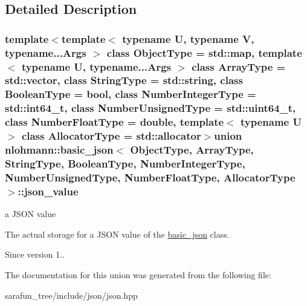 \subsection{Detailed Description}
\subsubsection*{template$<$template$<$ typename U, typename V, typename...\-Args $>$ class Object\-Type = std\-::map, template$<$ typename U, typename...\-Args $>$ class Array\-Type = std\-::vector, class String\-Type = std\-::string, class Boolean\-Type = bool, class Number\-Integer\-Type = std\-::int64\-\_\-t, class Number\-Unsigned\-Type = std\-::uint64\-\_\-t, class Number\-Float\-Type = double, template$<$ typename U $>$ class Allocator\-Type = std\-::allocator$>$union nlohmann\-::basic\-\_\-json$<$ Object\-Type, Array\-Type, String\-Type, Boolean\-Type, Number\-Integer\-Type, Number\-Unsigned\-Type, Number\-Float\-Type, Allocator\-Type $>$\-::json\-\_\-value}

a J\-S\-O\-N value 

The actual storage for a J\-S\-O\-N value of the \hyperlink{classnlohmann_1_1basic__json}{basic\-\_\-json} class.

\begin{DoxySince}{Since}
version 1.. 
\end{DoxySince}


The documentation for this union was generated from the following file\-:\begin{DoxyCompactItemize}
\item 
sarafun\-\_\-tree/include/json/json.\-hpp\end{DoxyCompactItemize}
